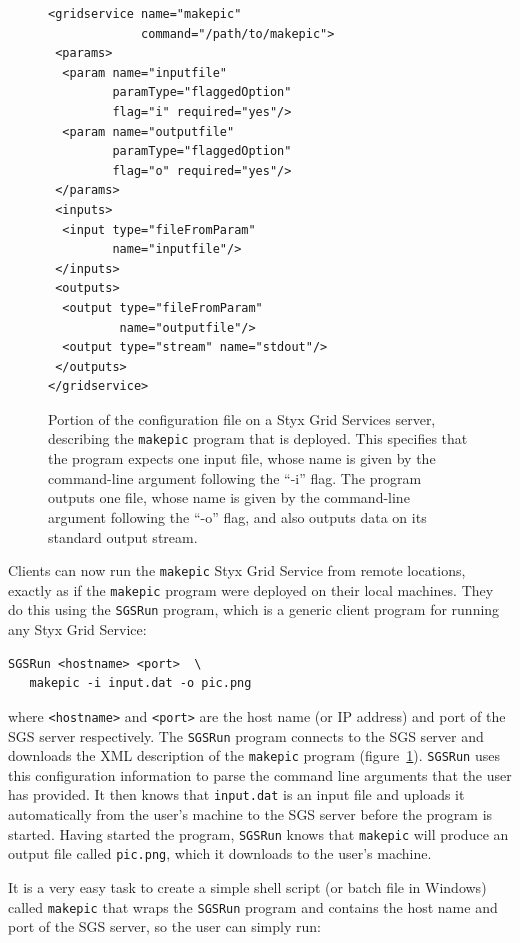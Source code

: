 \documentclass[times,10pt,twocolumn]{article}
\begin{document}
\begin{figure}
\centering
\small{
\begin{verbatim}
<gridservice name="makepic"
             command="/path/to/makepic">
 <params>
  <param name="inputfile"
         paramType="flaggedOption"
         flag="i" required="yes"/>
  <param name="outputfile"
         paramType="flaggedOption"
         flag="o" required="yes"/>
 </params>
 <inputs>
  <input type="fileFromParam"
         name="inputfile"/>
 </inputs>
 <outputs>
  <output type="fileFromParam"
          name="outputfile"/>
  <output type="stream" name="stdout"/>
 </outputs>
</gridservice>
\end{verbatim}
}
\caption{Portion of the configuration file on a Styx Grid Services server, describing the {\tt makepic} program that is deployed.  This specifies that the program expects one input file, whose name is given by the command-line argument following the ``-i'' flag.  The program outputs one file, whose name is given by the command-line argument following the ``-o'' flag, and also outputs data on its standard output stream.}
\label{fig:makepicconfig}
\end{figure}

Clients can now run the {\tt makepic} Styx Grid Service from remote locations, exactly as if the {\tt makepic} program were deployed on their local machines.  They do this using the {\tt SGSRun} program, which is a generic client program for running any Styx Grid Service:

\begin{verbatim}
SGSRun <hostname> <port>  \
   makepic -i input.dat -o pic.png
\end{verbatim}
where {\tt <hostname>} and {\tt <port>} are the host name (or IP address) and port of the SGS server respectively.  The {\tt SGSRun} program connects to the SGS server and downloads the XML description of the {\tt makepic} program  (figure~\ref{fig:makepicconfig}).  {\tt SGSRun} uses this configuration information to parse the command line arguments that the user has provided.  It then knows that {\tt input.dat} is an input file and uploads it automatically from the user's machine to the SGS server before the program is started.  Having started the program, {\tt SGSRun} knows that {\tt makepic} will produce an output file called {\tt pic.png}, which it downloads to the user's machine.

It is a very easy task to create a simple shell script (or batch file in Windows) called {\tt makepic} that wraps the {\tt SGSRun} program and contains the host name and port of the SGS server, so the user can simply run:
\end{document}
